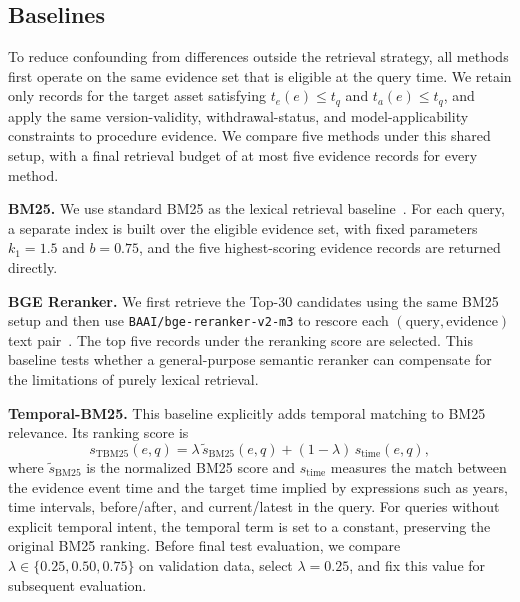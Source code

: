 \subsection{Baselines}
\label{sec:baselines}

To reduce confounding from differences outside the retrieval strategy, all methods first operate on the same evidence set that is eligible at the query time. We retain only records for the target asset satisfying
$t_e(e)\le t_q$ and $t_a(e)\le t_q$, and apply the same version-validity, withdrawal-status, and model-applicability constraints to procedure evidence. We compare five methods under this shared setup, with a final retrieval budget of at most five evidence records for every method.

\textbf{BM25.}
We use standard BM25 as the lexical retrieval baseline~\cite{robertson2009bm25}. For each query, a separate index is built over the eligible evidence set, with fixed parameters $k_1=1.5$ and $b=0.75$, and the five highest-scoring evidence records are returned directly.

\textbf{BGE Reranker.}
We first retrieve the Top-30 candidates using the same BM25 setup and then use \texttt{BAAI/bge-reranker-v2-m3} to rescore each $(\text{query},\text{evidence})$ text pair~\cite{chen2024bgem3,flagembedding2026reranker}. The top five records under the reranking score are selected. This baseline tests whether a general-purpose semantic reranker can compensate for the limitations of purely lexical retrieval.

\textbf{Temporal-BM25.}
This baseline explicitly adds temporal matching to BM25 relevance. Its ranking score is
\begin{equation}
s_{\mathrm{TBM25}}(e,q)
=
\lambda\,\widetilde{s}_{\mathrm{BM25}}(e,q)
+
(1-\lambda)\,s_{\mathrm{time}}(e,q),
\end{equation}
where $\widetilde{s}_{\mathrm{BM25}}$ is the normalized BM25 score and $s_{\mathrm{time}}$ measures the match between the evidence event time and the target time implied by expressions such as years, time intervals, before/after, and current/latest in the query. For queries without explicit temporal intent, the temporal term is set to a constant, preserving the original BM25 ranking. Before final test evaluation, we compare $\lambda\in\{0.25,0.50,0.75\}$ on validation data, select $\lambda=0.25$, and fix this value for subsequent evaluation.

